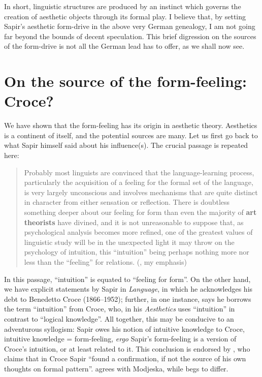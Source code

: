 \documentclass[output=paper]{langscibook}
\begin{document}
In short, linguistic structures are produced by an instinct which governs the creation of aesthetic objects through its formal play.  I believe that, by setting Sapir's aesthetic form-drive in the above very German genealogy, I am not going far beyond the bounds of decent speculation. This brief digression on the sources of the form-drive is not all the German lead has to offer, as we shall now see.

\section{On the source of the form-feeling: Croce?}
\label{sec:fortis:croce}

We have shown that the form-feeling has its origin in aesthetic theory. Aesthetics is a continent of itself, and the potential sources are many. Let us first go back to what Sapir himself said about his influence(s). The crucial passage is repeated here:

\begin{quotation}
Probably most linguists are convinced that the language-learning process, particularly the acquisition of a feeling for the formal set of the language, is very largely unconscious and involves mechanisms that are quite distinct in character from either sensation or reflection. There is doubtless something deeper about our feeling for form than even the majority of \textbf{art theorists} have divined, and it is not unreasonable to suppose that, as psychological analysis becomes more refined, one of the greatest values of linguistic study will be in the unexpected light it may throw on the psychology of intuition, this ``intuition'' being perhaps nothing more nor less than the ``feeling'' for relations. (\citealt[156]{Sapir1924}, my emphasis)
\end{quotation}

In this passage, ``intuition'' is equated to ``feeling for form''. On the other hand, we have explicit statements by Sapir in \emph{Language}, in which he acknowledges his debt to Benedetto Croce (1866--1952); further, in one instance, \citet[224]{Sapir1921} says he borrows the term ``intuition'' from Croce, who, in his \emph{Aesthetics} uses ``intuition'' in contrast to ``logical knowledge''. All together, this may be conducive to an adventurous syllogism: Sapir owes his notion of intuitive knowledge to Croce, intuitive knowledge = form-feeling, \emph{ergo} Sapir's form-feeling is a version of Croce's intuition, or at least related to it. This conclusion is endorsed by \citet[347]{Modjeska1968}, who claims that in Croce Sapir ``found a confirmation, if not the source of his own thoughts on formal pattern''. \citet{Hymes1969} agrees with Modjeska, while \citet{Hall1969} begs to differ.
\end{document}
